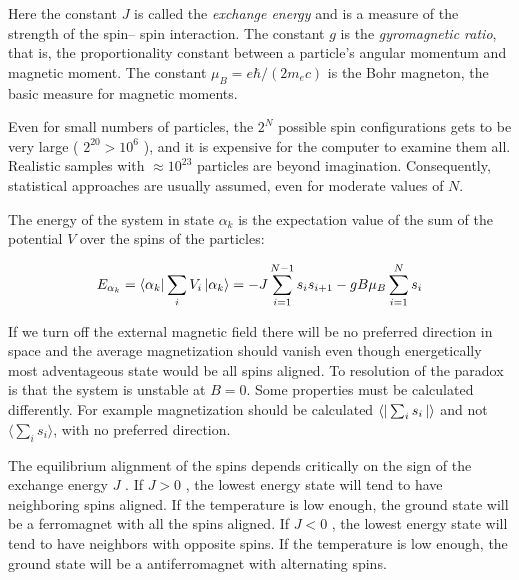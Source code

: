 \documentclass[12pt]{article}
\theoremstyle{plain}
\begin{document}
\vspace{2mm}

\par Here the constant $J$ is called the \textit{exchange energy} and is a measure of the strength of the spin–
spin interaction. The constant $g$ is the \textit{gyromagnetic ratio}, that is, the proportionality constant
between a particle’s angular momentum and magnetic moment. The constant $\mu_B = e\hbar / (2m_e c)$
is the Bohr magneton, the basic measure for magnetic moments.

\vspace{2mm}

\par Even for small numbers of particles, the $2^N$ possible spin configurations gets to be very
large ( $2^{20} > 10^6$ ), and it is expensive for the computer to examine them all. Realistic samples
with $\approx 10^{23}$ particles are beyond imagination. Consequently, statistical approaches are usually
assumed, even for moderate values of $N$.

\vspace{2mm}

\par The energy of the system in state $\alpha_k$ is the expectation value of the sum of the potential $V$
over the spins of the particles:

\vspace{2mm}

\begin{equation}
    E_{\alpha_k} = \bra{\alpha_k}\sum_{i}V_i\ket{\alpha_k} = -J\sum_{i=1}^{N-1}s_i s_{i+1} - gB\mu_{B}\sum_{i=1}^{N}s_i
    \label{energy}
\end{equation}

\vspace{2mm}

\par If we turn off the external magnetic field there will be no preferred
direction in space and the average magnetization should vanish even though
energetically most adventageous state would be all spins aligned. To
resolution of the paradox is that the system is unstable at $B=0$. Some properties must be
calculated differently. For example magnetization should be calculated $\bra{}\sum_{i}s_{i}\ket{}$
and not $\langle \sum_{i}s_{i}\rangle$, with no preferred direction.

\vspace{2mm}

\par The equilibrium alignment of the spins depends critically on the sign of the exchange
energy $J$ . If $J > 0$ , the lowest energy state will tend to have neighboring spins aligned. If the
temperature is low enough, the ground state will be a ferromagnet with all the spins aligned.
If $J < 0$ , the lowest energy state will tend to have neighbors with opposite spins. If the
temperature is low enough, the ground state will be a antiferromagnet with alternating spins.
\end{document}
